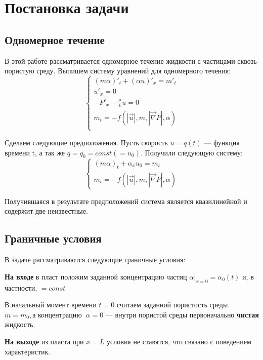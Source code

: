 \documentclass[a4paper,12pt]{article}
\begin{document}
\section{Постановка задачи}
\subsection{Одномерное течение}
\par В этой работе рассматривается одномерное течение жидкости с частицами сквозь пористую среду. Выпишем систему уравнений для одномерного течения:
$$\displaystyle \begin {cases}
(m\alpha)'_{t}+(\alpha u)'_{x}=m'_{t}\\
u'_{x}=0\\
\displaystyle -P'_{x}-\frac{\mu}{k}u=0\\
m_{t}=-f(|\vec{u}|, m,|\vec{\nabla} P| , \alpha)\\
\end {cases}$$

\par Сделаем следующие предположения. Пусть скорость $u=q(t)$ --- функция времени t, а так же $q=q_{0}=const(=u_{0})$. Получили следующую систему:\\
$$\begin {cases}
(m\alpha)_{t}+\alpha_{x}u_{0}=m_{t}\\
m_{t}=-f(|\vec{u}|, m,|\vec{\nabla} P| , \alpha)
\end{cases}$$
\par Получившаяся в результате предположений система является квазилинейной и содержит две неизвестные.

\subsection{Граничные условия}
\par В задаче рассматриваются следующие граничные условия:
\par \textbf{На входе} в пласт положим заданной концентрацию частиц $\alpha|_{x=0}=\alpha_{0}(t)$ и, в частности, $=const$\\
\par В начальный момент времени $t=0$ считаем заданной пористость среды  $m=m_{0},\text{а концентрацию}\;\;\alpha=0$ --- внутри пористой среды первоначально \textbf{чистая} жидкость.\\
\par \textbf{На выходе} из пласта при $x=L$ условия не ставятся, что связано с поведением характеристик.\\
\pagebreak
\end{document}
